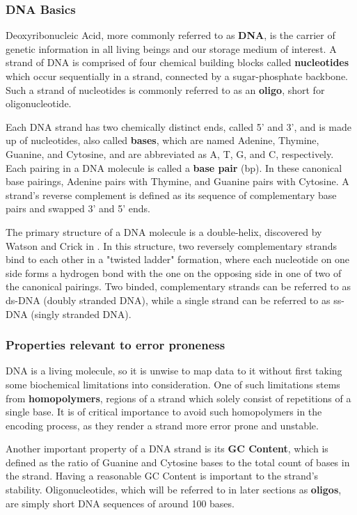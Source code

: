 \documentclass[a4paper,conference]{IEEEtran}
\begin{document}
\subsubsection{DNA Basics}
Deoxyribonucleic Acid, more commonly referred to as \textbf{DNA}, is the carrier of genetic information in all living beings and our storage medium of interest. A strand of DNA is comprised of four chemical building blocks called \textbf{nucleotides} which occur sequentially in a strand, connected by a sugar-phosphate backbone. Such a strand of nucleotides is commonly referred to as an \textbf{oligo}, short for oligonucleotide.

Each DNA strand has two chemically distinct ends, called 5' and 3', and is made up of nucleotides, also called \textbf{bases}, which are named Adenine, Thymine, Guanine, and Cytosine, and are abbreviated as A, T, G, and C, respectively. Each pairing in a DNA molecule is called a \textbf{base pair} (bp). In these canonical base pairings, Adenine pairs with Thymine, and Guanine pairs with Cytosine. A strand's reverse complement is defined as its sequence of complementary base pairs and swapped 3' and 5' ends.

The primary structure of a DNA molecule is a double-helix, discovered by Watson and Crick in \cite{3}. In this structure, two reversely complementary strands bind to each other in a "twisted ladder" formation, where each nucleotide on one side forms a hydrogen bond with the one on the opposing side in one of two of the canonical pairings. Two binded, complementary strands can be referred to as ds-DNA (doubly stranded DNA), while a single strand can be referred to as ss-DNA (singly stranded DNA).



\subsubsection{Properties relevant to error proneness}
DNA is a living molecule, so it is unwise to map data to it without first taking some biochemical limitations into consideration. One of such limitations stems from \textbf{homopolymers}, regions of a strand which solely consist of repetitions of a single base. It is of critical importance to avoid such homopolymers in the encoding process, as they render a strand more error prone \cite{?} and unstable.

Another important property of a DNA strand is its \textbf{GC Content}, which is defined as the ratio of Guanine and Cytosine bases to the total count of bases in the strand. Having a reasonable GC Content \cite{?} is important to the strand's stability. Oligonucleotides, which will be referred to in later sections as \textbf{oligos}, are simply short DNA sequences of around 100 bases.
\end{document}
